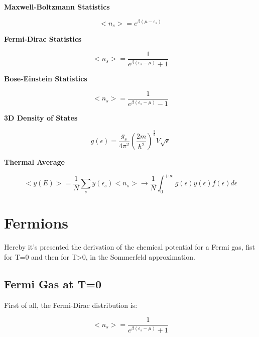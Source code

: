\documentclass{article}
\begin{document}
\newpage
\begin{tcolorbox}[colframe=gray!90, colback=gray!5, coltitle=white, sharp corners, title=\textbf{Quantum Statistical Mechanics, Summary}, fonttitle=\large\bfseries]
    \textbf{Maxwell-Boltzmann Statistics}

    \begin{equation}
        <n_s>=e^{\beta(\mu-\epsilon_s)}
    \end{equation}

    \textbf{Fermi-Dirac Statistics}

    \begin{equation}
        <n_s>=\frac{1}{e^{\beta(\epsilon_s-\mu)}+1}
    \end{equation}

    \textbf{Bose-Einstein Statistics}

    \begin{equation}
        <n_s>=\frac{1}{e^{\beta(\epsilon_s-\mu)}-1}
    \end{equation}

    \textbf{3D Density of States}

    \begin{equation}
        g(\epsilon)=\frac{g_s}{4\pi^2}\left( \frac{2m}{\hbar^2} \right)^{\frac{3}{2}}V\sqrt{\epsilon}
    \end{equation}

    \textbf{Thermal Average}

    \begin{equation}
        <y(E)>=\frac{1}{N}\sum_{s}y(\epsilon_s)<n_s>\rightarrow \frac{1}{N}\int_0^{+\infty}g(\epsilon)y(\epsilon)f(\epsilon)d\epsilon
    \end{equation}
\end{tcolorbox}
\newpage

\section{Fermions}

Hereby it's presented the derivation of the chemical potential for a Fermi gas,
fist for T=0 and then for T>0, in the Sommerfeld approximation.

\subsection{Fermi Gas at T=0}

First of all, the Fermi-Dirac distribution is:

\begin{equation}
    <n_s>=\frac{1}{e^{\beta(\epsilon_s-\mu)}+1}
\end{equation}
\end{document}
